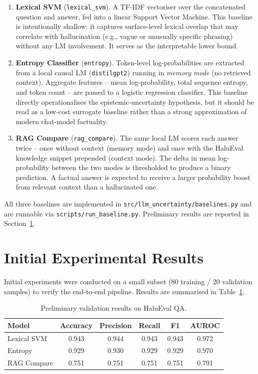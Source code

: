 \documentclass[12pt,a4paper]{article}
\begin{document}
\begin{enumerate}
  \item \textbf{Lexical SVM} (\texttt{lexical\_svm}). A TF-IDF vectoriser over the concatenated question and answer, fed into a linear Support Vector Machine. This baseline is intentionally shallow: it captures surface-level lexical overlap that may correlate with hallucination (e.g., vague or unusually specific phrasing) without any LM involvement. It serves as the interpretable lower bound.

  \item \textbf{Entropy Classifier} (\texttt{entropy}). Token-level log-probabilities are extracted from a local causal LM (\texttt{distilgpt2}) running in \emph{memory mode} (no retrieved context). Aggregate features -- mean log-probability, total sequence entropy, and token count -- are passed to a logistic regression classifier. This baseline directly operationalises the epistemic-uncertainty hypothesis, but it should be read as a low-cost surrogate baseline rather than a strong approximation of modern chat-model factuality.

  \item \textbf{RAG Compare} (\texttt{rag\_compare}). The same local LM scores each answer twice -- once without context (memory mode) and once with the HaluEval knowledge snippet prepended (context mode). The delta in mean log-probability between the two modes is thresholded to produce a binary prediction. A factual answer is expected to receive a larger probability boost from relevant context than a hallucinated one.
\end{enumerate}

All three baselines are implemented in \texttt{src/llm\_uncertainty/baselines.py} and are runnable via \texttt{scripts/run\_baseline.py}. Preliminary results are reported in Section~\ref{sec:results}.

\section{Initial Experimental Results}
\label{sec:results}

Initial experiments were conducted on a small subset (80 training / 20 validation samples) to verify the end-to-end pipeline. Results are summarised in Table~\ref{tab:results}.

\begin{table}[h!]
\centering
\caption{Preliminary validation results on HaluEval QA.}
\label{tab:results}
\renewcommand{\arraystretch}{1.3}
\begin{tabular}{lccccc}
\toprule
\textbf{Model} & \textbf{Accuracy} & \textbf{Precision} & \textbf{Recall} & \textbf{F1} & \textbf{AUROC} \\
\midrule
Lexical SVM    & 0.943  & 0.944 & 0.943 & 0.943 & 0.972 \\
Entropy        & 0.929  & 0.930 & 0.929 & 0.929 & 0.970 \\
RAG Compare    & 0.751  & 0.751 & 0.751 & 0.751 & 0.791 \\
\bottomrule
\end{tabular}
\end{table}
\end{document}
